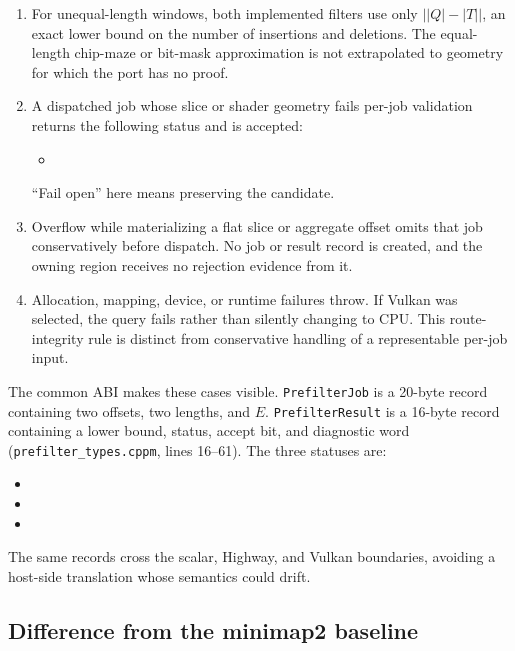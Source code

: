 \begin{enumerate}
    \item For unequal-length windows, both implemented filters use only
    \(\lvert |Q|-|T| \rvert\), an exact lower bound on the number of
    insertions and deletions.  The equal-length chip-maze or bit-mask
    approximation is not extrapolated to geometry for which the port has no
    proof.
    \item A dispatched job whose slice or shader geometry fails per-job
    validation returns the following status and is accepted:
    \begin{itemize}
        \item {}
    \end{itemize}
    ``Fail open'' here means preserving the candidate.
    \item Overflow while materializing a flat slice or aggregate offset omits
    that job conservatively before dispatch.  No job or result record is
    created, and the owning region receives no rejection evidence from it.
    \item Allocation, mapping, device, or runtime failures throw.  If Vulkan
    was selected, the query fails rather than silently changing to CPU.  This
    route-integrity rule is distinct from conservative handling of a
    representable per-job input.
\end{enumerate}

The common ABI makes these cases visible.  \texttt{PrefilterJob} is a 20-byte
record containing two offsets, two lengths, and \(E\).
\texttt{PrefilterResult} is a 16-byte record containing a lower bound, status,
accept bit, and diagnostic word
(\texttt{prefilter\_types.cppm}, lines 16--61).  The three statuses are:

\begin{itemize}
    \item {}
    \item {}
    \item {}
\end{itemize}

The same records cross the scalar, Highway, and Vulkan boundaries, avoiding a
host-side translation whose semantics could drift.

\subsection{Difference from the minimap2 baseline}

